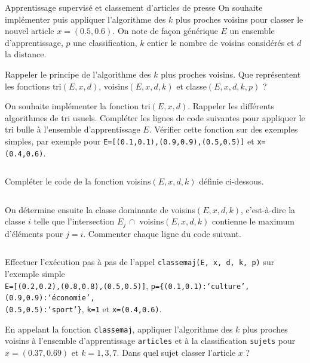 \begin{exo}[PC][2][TD]{Apprentissage supervisé et classement d'articles de presse}
 On souhaite implémenter puis appliquer l'algorithme des $k$ plus proches voisins pour classer le nouvel article $x=(0.5,0.6)$. On note de façon générique $E$ un ensemble d'apprentissage, $p$ une classification, $k$ entier le nombre de voisins considérés et $d$ la distance.
\begin{quest}
\item Rappeler le principe de l'algorithme des $k$ plus proches voisins. Que représentent les fonctions {\rm{tri}}$(E,x,d)$, {\rm{voisins}}$(E,x,d,k)$ et {\rm{classe}}$(E,x,d,k,p)$ ?
\item On souhaite implémenter la fonction {\rm{tri}}$(E,x,d)$. Rappeler les différents algorithmes de tri usuels. Compléter les lignes de code suivantes pour appliquer le tri bulle à l'ensemble d'apprentissage $E$. Vérifier cette fonction sur des exemples simples, par exemple pour \texttt{E=[(0.1,0.1),(0.9,0.9),(0.5,0.5)]} et \texttt{x=(0.4,0.6)}.
  \inputminted[linenos=true,frame=single]{python}{\pathtoexos/Info/Scripts/tri_xy.py} 
\item Compléter le code de la fonction {\rm{voisins}}$(E,x,d,k)$ définie ci-dessous. 
  \inputminted[linenos=true,frame=single]{python}{\pathtoexos/Info/Scripts/voisins_xy.py}
\item On détermine ensuite la classe dominante de {\rm{voisins}}$(E,x,d,k)$, c'est-à-dire la classe $i$ telle que l'intersection $E_j\, \cap $ {\rm{voisins}}$(E,x,d,k)$ contienne le maximum d'éléments pour $j=i$. Commenter chaque ligne du code suivant.
  \inputminted[linenos=true,frame=single]{python}{\pathtoexos/Info/Scripts/classe_xy.py}
Effectuer l'exécution pas à pas de l'appel \texttt{classemaj(E, x, d, k, p)} sur l'exemple simple \\ \texttt{E=[(0.2,0.2),(0.8,0.8),(0.5,0.5)]},
\texttt{p=\{(0.1,0.1):`culture',(0.9,0.9):`économie',}\\ 
\texttt{(0.5,0.5):`sport'\}}, \texttt{k=1} et \texttt{x=(0.4,0.6)}. 
\item En appelant la fonction \texttt{classemaj}, appliquer l'algorithme des $k$ plus proches voisins à l'ensemble d'apprentissage \texttt{articles} et à la classification \texttt{sujets} pour $x=(0.37,0.69)$ et $k=1,3,7$. Dans quel sujet classer l'article $x$ ? 


\end{quest}
\end{exo}
